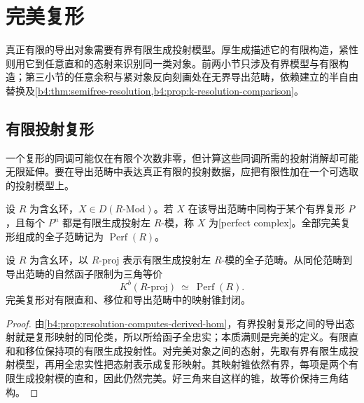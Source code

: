 
\section{完美复形}
\label{b4:sec:2002}

真正有限的导出对象需要有界有限生成投射模型。厚生成描述它的有限构造，紧性则用它到任意直和的态射来识别同一类对象。前两小节只涉及有界模型与有限构造；第三小节的任意余积与紧对象反向刻画处在无界导出范畴，依赖建立的半自由替换及\cref{b4:thm:semifree-resolution,b4:prop:k-resolution-comparison}。


%
%

\subsection{有限投射复形}
\label{b4:subsec:2002:01}

一个复形的同调可能仅在有限个次数非零，但计算这些同调所需的投射消解却可能无限延伸。要在导出范畴中表达真正有限的投射数据，应把有限性加在一个可选取的投射模型上。

\begin{definition}\label{b4:def:perfect-complex}
	设 \(R\) 为含幺环，\(X\in D(R\text{-}\mathrm{Mod})\)。若 \(X\) 在该导出范畴中同构于某个有界复形 \(P\)，且每个 \(P^n\) 都是有限生成投射左 \(R\)-模，称 \(X\) 为[perfect complex]。全部完美复形组成的全子范畴记为 \(\operatorname{Perf}(R)\)。
\end{definition}

\begin{proposition}\label{b4:prop:perfect-homotopy-model}
	设 \(R\) 为含幺环，以 \(R\text{-}\mathrm{proj}\) 表示有限生成投射左 \(R\)-模的全子范畴。从同伦范畴到导出范畴的自然函子限制为三角等价
	\[
		K^b(R\text{-}\mathrm{proj})\ \simeq\ \operatorname{Perf}(R).
	\]
	完美复形对有限直和、移位和导出范畴中的映射锥封闭。
\end{proposition}
\begin{proof}
	由\cref{b4:prop:resolution-computes-derived-hom}，有界投射复形之间的导出态射就是复形映射的同伦类，所以所给函子全忠实；本质满则是完美的定义。有限直和和移位保持项的有限生成投射性。对完美对象之间的态射，先取有界有限生成投射模型，再用全忠实性把态射表示成复形映射。其映射锥依然有界，每项是两个有限生成投射模的直和，因此仍然完美。好三角来自这样的锥，故等价保持三角结构。
\end{proof}

